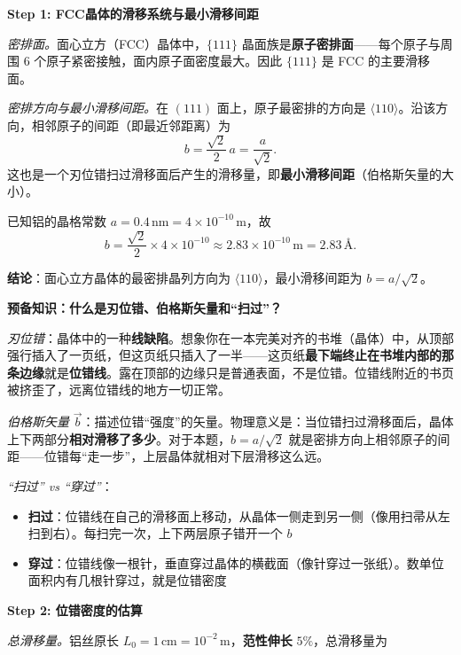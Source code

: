\begin{derivationbox}[标准解题过程]
\textbf{Step 1: FCC晶体的滑移系统与最小滑移间距}

\textit{密排面。}面心立方（FCC）晶体中，$\{111\}$ 晶面族是\textbf{原子密排面}——每个原子与周围 $6$ 个原子紧密接触，面内原子面密度最大。因此 $\{111\}$ 是 FCC 的主要滑移面。

\textit{密排方向与最小滑移间距。}在 $(111)$ 面上，原子最密排的方向是 $\langle 110\rangle$。沿该方向，相邻原子的间距（即最近邻距离）为
\begin{equation}
b = \frac{\sqrt{2}}{2}\,a = \frac{a}{\sqrt{2}}.
\end{equation}
这也是一个刃位错扫过滑移面后产生的滑移量，即\textbf{最小滑移间距}（伯格斯矢量的大小）。

已知铝的晶格常数 $a=0.4\,\mathrm{nm}=4\times 10^{-10}\,\mathrm{m}$，故
\begin{equation}
b = \frac{\sqrt{2}}{2}\times 4\times 10^{-10}
\approx 2.83\times 10^{-10}\,\mathrm{m} = 2.83\,\text{\AA}.
\end{equation}

\textbf{结论}：面心立方晶体的最密排晶列方向为 $\langle 110\rangle$，最小滑移间距为 $b=a/\sqrt{2}$。

\textbf{预备知识：什么是刃位错、伯格斯矢量和``扫过''？}

\textit{刃位错}：晶体中的一种\textbf{线缺陷}。想象你在一本完美对齐的书堆（晶体）中，从顶部强行插入了一页纸，但这页纸只插入了一半——这页纸\textbf{最下端终止在书堆内部的那条边缘}就是\textbf{位错线}。露在顶部的边缘只是普通表面，不是位错。位错线附近的书页被挤歪了，远离位错线的地方一切正常。

\textit{伯格斯矢量} $\vec{b}$：描述位错``强度''的矢量。物理意义是：当位错扫过滑移面后，晶体上下两部分\textbf{相对滑移了多少}。对于本题，$b=a/\sqrt{2}$ 就是密排方向上相邻原子的间距——位错每``走一步''，上层晶体就相对下层滑移这么远。

\textit{``扫过'' vs ``穿过''}：
\begin{itemize}
    \item \textbf{扫过}：位错线在自己的滑移面上移动，从晶体一侧走到另一侧（像用扫帚从左扫到右）。每扫完一次，上下两层原子错开一个 $b$
    \item \textbf{穿过}：位错线像一根针，垂直穿过晶体的横截面（像针穿过一张纸）。数单位面积内有几根针穿过，就是位错密度
\end{itemize}

\textbf{Step 2: 位错密度的估算}

\textit{总滑移量。}铝丝原长 $L_0=1\,\mathrm{cm}=10^{-2}\,\mathrm{m}$，\textbf{范性伸长} $5\%$，总滑移量为


\end{derivationbox}
